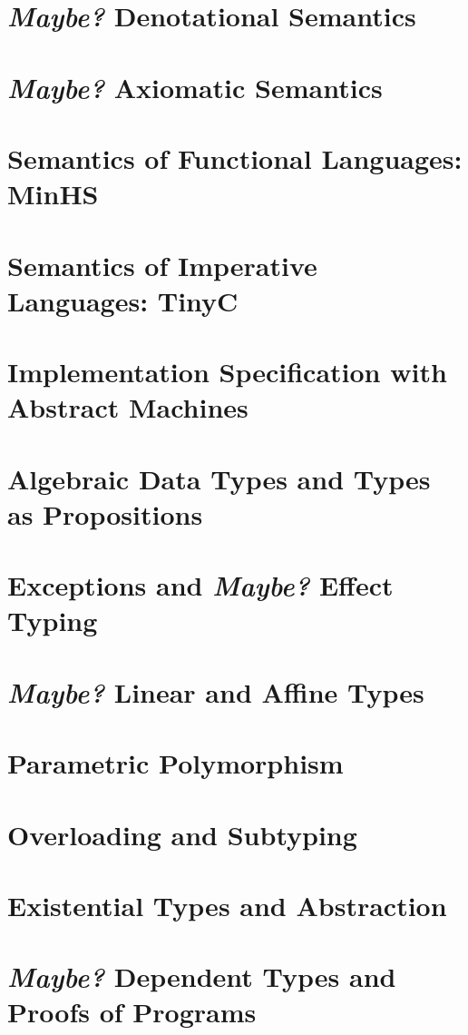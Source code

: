 \documentclass{book}
\begin{document}
\chapter{\emph{Maybe?} Denotational Semantics}
\lipsum[1-20]
\chapter{\emph{Maybe?} Axiomatic Semantics}
\lipsum[1-20]
\chapter{Semantics of Functional Languages: MinHS}
\lipsum[1-20]
\chapter{Semantics of Imperative Languages: TinyC}
\lipsum[1-20]
\chapter{Implementation Specification with Abstract Machines}
\lipsum[1-20]
\chapter{Algebraic Data Types and Types as Propositions}
\lipsum[1-20]
\chapter{Exceptions and \emph{Maybe?} Effect Typing}
\lipsum[1-20]
\chapter{\emph{Maybe?} Linear and Affine Types}
\lipsum[1-20]
\chapter{Parametric Polymorphism}
\lipsum[1-20]
\chapter{Overloading and Subtyping}
\lipsum[1-20]
\chapter{Existential Types and Abstraction}
\lipsum[1-20]
\chapter{\emph{Maybe?} Dependent Types and Proofs of Programs}
\lipsum[1-20]
\end{document}
